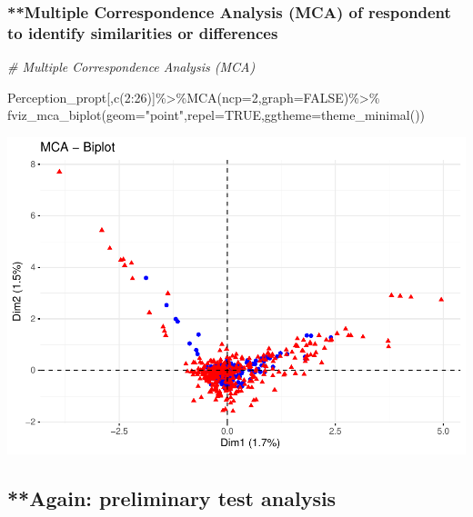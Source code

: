 \documentclass[
]{article}
\newenvironment{Shaded}{\begin{snugshade}}{\end{snugshade}}
\newcommand{\AttributeTok}[1]{\textcolor[rgb]{0.77,0.63,0.00}{#1}}
\newcommand{\CommentTok}[1]{\textcolor[rgb]{0.56,0.35,0.01}{\textit{#1}}}
\newcommand{\ConstantTok}[1]{\textcolor[rgb]{0.00,0.00,0.00}{#1}}
\newcommand{\DecValTok}[1]{\textcolor[rgb]{0.00,0.00,0.81}{#1}}
\newcommand{\FunctionTok}[1]{\textcolor[rgb]{0.00,0.00,0.00}{#1}}
\newcommand{\NormalTok}[1]{#1}
\newcommand{\SpecialCharTok}[1]{\textcolor[rgb]{0.00,0.00,0.00}{#1}}
\newcommand{\StringTok}[1]{\textcolor[rgb]{0.31,0.60,0.02}{#1}}
\begin{document}
\hypertarget{multiple-correspondence-analysis-mca-of-respondent-to-identify-similarities-or-differences}{%
\subsubsection{**Multiple Correspondence Analysis (MCA) of respondent to
identify similarities or
differences}\label{multiple-correspondence-analysis-mca-of-respondent-to-identify-similarities-or-differences}}

\begin{Shaded}
\begin{Highlighting}[]
\CommentTok{\# Multiple Correspondence Analysis (MCA)}

\NormalTok{Perception\_propt[,}\FunctionTok{c}\NormalTok{(}\DecValTok{2}\SpecialCharTok{:}\DecValTok{26}\NormalTok{)]}\SpecialCharTok{\%\textgreater{}\%}\FunctionTok{MCA}\NormalTok{(}\AttributeTok{ncp=}\DecValTok{2}\NormalTok{,}\AttributeTok{graph=}\ConstantTok{FALSE}\NormalTok{)}\SpecialCharTok{\%\textgreater{}\%}
  \FunctionTok{fviz\_mca\_biplot}\NormalTok{(}\AttributeTok{geom=}\StringTok{"point"}\NormalTok{,}\AttributeTok{repel=}\ConstantTok{TRUE}\NormalTok{,}\AttributeTok{ggtheme=}\FunctionTok{theme\_minimal}\NormalTok{())}
\end{Highlighting}
\end{Shaded}

\includegraphics{Infertility-Perception-Analysis_files/figure-latex/unnamed-chunk-1-1.pdf}

\hypertarget{again-preliminary-test-analysis}{%
\subsection{**Again: preliminary test
analysis}\label{again-preliminary-test-analysis}}
\end{document}
